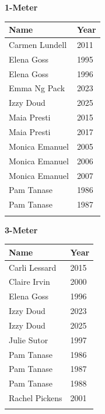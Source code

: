 \hfill
\begin{minipage}[t]{0.48\textwidth}
\centering
\textbf{\textcolor{teamprimary}{1-Meter}}\par
\vspace{0.5em}
\centering
\small
\renewcommand{\arraystretch}{1.0}
\setlength{\tabcolsep}{4pt}
\begin{tabular}{@{}p{3.0cm}p{1.0cm}@{}}
\toprule
\textbf{Name} & \textbf{Year} \\
\midrule
Carmen Lundell & 2011 \\
Elena Goss & 1995 \\
Elena Goss & 1996 \\
Emma Ng Pack & 2023 \\
Izzy Doud & 2025 \\
Maia Presti & 2015 \\
Maia Presti & 2017 \\
Monica Emanuel & 2005 \\
Monica Emanuel & 2006 \\
Monica Emanuel & 2007 \\
Pam Tanase & 1986 \\
Pam Tanase & 1987 \\
\bottomrule
\vspace{0.5em}
\end{tabular}
\end{minipage}
\vspace{1.2em}
\noindent\begin{minipage}[t]{0.48\textwidth}
\centering
\textbf{\textcolor{teamprimary}{3-Meter}}\par
\vspace{0.5em}
\centering
\small
\renewcommand{\arraystretch}{1.0}
\setlength{\tabcolsep}{4pt}
\begin{tabular}{@{}p{3.0cm}p{1.0cm}@{}}
\toprule
\textbf{Name} & \textbf{Year} \\
\midrule
Carli Lessard & 2015 \\
Claire Irvin & 2000 \\
Elena Goss & 1996 \\
Izzy Doud & 2023 \\
Izzy Doud & 2025 \\
Julie Sutor & 1997 \\
Pam Tanase & 1986 \\
Pam Tanase & 1987 \\
Pam Tanase & 1988 \\
Rachel Pickens & 2001 \\
\bottomrule
\vspace{0.5em}
\end{tabular}
\end{minipage}

